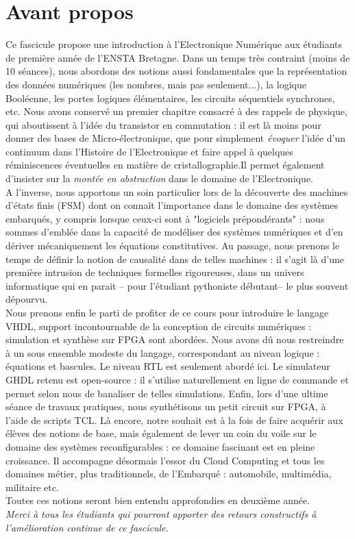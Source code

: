 \chapter*{Avant propos}

Ce fascicule propose une introduction à l'Electronique Numérique aux étudiants de première année
de l'ENSTA Bretagne. Dans un temps très contraint (moins de 10 séances), nous abordons des notions
aussi fondamentales que la représentation des données numériques (les nombres, mais pas seulement...),
la logique Booléenne, les portes logiques élémentaires, les circuits séquentiels synchrones, etc. Nous avons conservé
un premier chapitre consacré à des rappels de physique, qui aboutissent à l'idée du transistor en commutation : il est là
moins pour donner des bases de Micro-électronique, que pour simplement {\it évoquer} l'idée d'un continuum dans l'Histoire de l'Electronique
et faire appel à quelques réminiscences  éventuelles en matière de cristallographie.Il permet également d'insister sur la {\it montée en abstraction} dans le domaine de l'Electronique.\\

A l'inverse, nous apportons un soin particulier lors de la découverte des machines d'états finis (FSM) dont on connaît l'importance dans le domaine
des systèmes embarqués, y compris lorsque ceux-ci sont à "logiciels prépondérants" : nous sommes  d'emblée
dans la capacité de modéliser des systèmes numériques et d'en dériver mécaniquement les équations constitutives.
Au passage, nous prenons le temps de définir la notion de causalité dans de telles machines : il s'agit là
d'une première intrusion de techniques formelles rigoureuses, dans un univers informatique qui en parait -- pour l'étudiant pythoniste débutant-- le plus souvent
dépourvu.\\

Nous prenons enfin le parti de profiter de ce cours pour introduire le langage VHDL, support incontournable
de la conception de circuits numériques : simulation et synthèse sur FPGA sont abordées. Nous avons dû nous restreindre
à un sous ensemble modeste du langage, correspondant au niveau logique : équations et bascules. Le niveau RTL est seulement abordé ici.
Le simulateur GHDL retenu est open-source : il s'utilise naturellement en ligne de commande et permet selon nous de banaliser de telles simulations.
Enfin, lors d'une ultime séance de travaux pratiques, nous synthétisons un petit circuit sur FPGA, à l'aide de scripts TCL.
Là encore, notre souhait est à la fois de faire acquérir aux élèves des notions de base, mais également de lever un coin du voile
sur le domaine des systèmes reconfigurables : ce domaine fascinant est en pleine croissance. Il accompagne désormais l'essor du Cloud Computing et tous les domaines
métier, plus traditionnels, de l'Embarqué : automobile, multimédia, militaire etc.\\

Toutes ces notions seront bien entendu approfondies en deuxième année.\\

{\it Merci à tous les étudiants qui pourront apporter des retours constructifs à l'amélioration continue de ce fascicule.}
